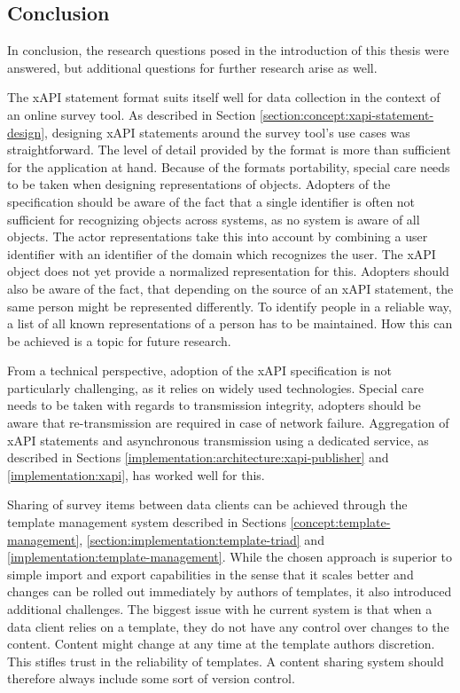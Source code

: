     \subsection{Conclusion}

    In conclusion, the research questions posed in the introduction of this
    thesis were answered, but additional questions for further research arise
    as well.

    The xAPI statement format suits itself well for data collection
    in the context of an online survey tool. As described in Section \ref{section:concept:xapi-statement-design},
    designing xAPI statements around the survey tool's use cases was
    straightforward. The level of detail provided by the format is
    more than sufficient for the application at hand. Because of the
    formats portability, special care needs to be taken when designing
    representations of objects. Adopters of the specification should
    be aware of the fact that a single identifier is often not sufficient
    for recognizing objects across systems, as no system is aware of all objects.
    The actor representations take this into account by combining a user identifier
    with an identifier of the domain which recognizes the user. The xAPI object does not yet
    provide a normalized representation for this. Adopters should also be aware
    of the fact, that depending on the source of an xAPI statement, the same person
    might be represented differently. To identify people in a reliable way,
    a list of all known representations of a person has to be maintained.
    How this can be achieved is a topic for future research.
    
    From a technical perspective, adoption of the xAPI specification is
    not particularly challenging, as it relies on widely used technologies.
    Special care needs to be taken with regards to transmission integrity,
    adopters should be aware that re-transmission are required in case of
    network failure. Aggregation of xAPI statements and asynchronous transmission
    using a dedicated service, as described in Sections \ref{implementation:architecture:xapi-publisher}
    and \ref{implementation:xapi}, has worked well for this.

    Sharing of survey items between data clients can be achieved through
    the template management system described in Sections \ref{concept:template-management},
    \ref{section:implementation:template-triad} and \ref{implementation:template-management}.
    While the chosen approach is superior to simple import and export capabilities
    in the sense that it scales better and changes can be rolled out immediately 
    by authors of templates, it also introduced additional challenges.
    The biggest issue with he current system is that when a data client relies on a template,
    they do not have any control over changes to the content. Content might change
    at any time at the template authors discretion. This stifles trust in the reliability
    of templates. A content sharing system should therefore always include some sort
    of version control.

